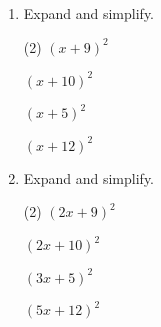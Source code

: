 \clearpage


\begin{enumerate} [leftmargin=0cm] 
\item Expand and simplify.
\begin{tasks}[label=(\arabic*), after-item-skip=2pt,after-skip=3pt, label-width=4ex](2)
    \task  $ (x+ 9)^2   $    \\  \begin{envAnswer} { }\end{envAnswer}
    \task  $ (x+10)^2   $    \\  \begin{envAnswer} { }\end{envAnswer}
    \task  $ (x+ 5)^2   $    \\  \begin{envAnswer} { }\end{envAnswer}
    \task  $ (x+12)^2   $    \\  \begin{envAnswer} { }\end{envAnswer}
\end{tasks}

\item Expand and simplify.
\begin{tasks}[label=(\arabic*), after-item-skip=2pt,after-skip=3pt, label-width=4ex](2)
    \task  $ (2x+ 9)^2  $    \\  \begin{envAnswer} { }\end{envAnswer}
    \task  $ (2x+10)^2  $    \\  \begin{envAnswer} { }\end{envAnswer}
    \task  $ (3x+ 5)^2  $    \\  \begin{envAnswer} { }\end{envAnswer}
    \task  $ (5x+12)^2  $    \\  \begin{envAnswer} { }\end{envAnswer}
\end{tasks}



\end{enumerate}
